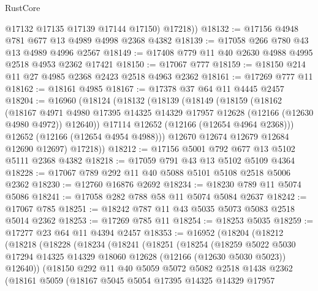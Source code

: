\begin{lexlean}{RustCore}
\begin{coremodule}
          @17132
          @17135
          @17139
          @17144
          @17150)
        @17218))
@18132 := @17156 @4948 @781 @677 @13 @4989 @4998 @2368 @4382
@18139 := @17058 @266 @780 @43 @13 @4989 @4996 @2567
@18149 := @17408 @779 @11 @40 @2630 @4988 @4995 @2518 @4953 @2362 @17421
@18150 := @17067 @777
@18159 := @18150 @214 @11 @27 @4985 @2368 @2423 @2518 @4963 @2362
@18161 := @17269 @777 @11
@18162 := @18161 @4985
@18167 := @17378 @37 @64 @11 @4445 @2457
@18204 := @16960
    (@18124
      (@18132
        (@18139
          (@18149
            (@18159
              (@18162
                (@18167
                  @4971
                  @4980
                  @17395
                  @14325
                  @14329
                  @17957
                  @12628
                  (@12166 (@12630 @4980 @4972))
                  @12640))
              @17114
              @12652
              (@12166 (@12654 @4964 @2368)))
            @12652
            (@12166 (@12654 @4954 @4988)))
          @12670
          @12674
          @12679
          @12684
          @12690
          @12697)
        @17218))
@18212 := @17156 @5001 @792 @677 @13 @5102 @5111 @2368 @4382
@18218 := @17059 @791 @43 @13 @5102 @5109 @4364
@18228 := @17067 @789 @292 @11 @40 @5088 @5101 @5108 @2518 @5006 @2362
@18230 := @12760 @16876 @2692
@18234 := @18230 @789 @11 @5074 @5086
@18241 := @17058 @282 @788 @58 @11 @5074 @5084 @2637
@18242 := @17067 @785
@18251 := @18242 @787 @11 @43 @5035 @5073 @5083 @2518 @5014 @2362
@18253 := @17269 @785 @11
@18254 := @18253 @5035
@18259 := @17277 @23 @64 @11 @4394 @2457
@18353 := @16952
    (@18204
      (@18212
        (@18218
          (@18228
            (@18234
              (@18241
                (@18251
                  (@18254
                    (@18259
                      @5022
                      @5030
                      @17294
                      @14325
                      @14329
                      @18060
                      @12628
                      (@12166 (@12630 @5030 @5023))
                      @12640))
                  (@18150
                    @292
                    @11
                    @40
                    @5059
                    @5072
                    @5082
                    @2518
                    @1438
                    @2362
                    (@18161
                      @5059
                      (@18167
                        @5045
                        @5054
                        @17395
                        @14325
                        @14329
                        @17957

\end{coremodule}
\end{lexlean}
